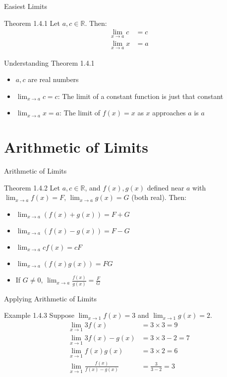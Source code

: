 \documentclass[aspectratio=169]{beamer}
\newcommand{\limx}[2]{\lim_{x \to #1} #2}
\begin{document}
\begin{frame}{Easiest Limits}
\begin{block}{Theorem 1.4.1}
Let $a, c \in \mathbb{R}$. Then:
\begin{align*}
  \limx{a}{c} &= c \\
  \limx{a}{x} &= a
\end{align*}
\end{block}
\end{frame}

\begin{frame}{Understanding Theorem 1.4.1}
\begin{itemize}
  \item $a, c$ are real numbers
  \item $\limx{a}{c} = c$: The limit of a constant function is just that constant
  \item $\limx{a}{x} = a$: The limit of $f(x) = x$ as $x$ approaches $a$ is $a$
\end{itemize}
\end{frame}

\section{Arithmetic of Limits}

\begin{frame}{Arithmetic of Limits}
\begin{block}{Theorem 1.4.2}
Let $a, c \in \mathbb{R}$, and $f(x), g(x)$ defined near $a$ with $\limx{a}{f(x)} = F$, $\limx{a}{g(x)} = G$ (both real). Then:
\begin{itemize}
  \item $\limx{a}{(f(x) + g(x))} = F + G$
  \item $\limx{a}{(f(x) - g(x))} = F - G$
  \item $\limx{a}{c f(x)} = cF$
  \item $\limx{a}{(f(x) g(x))} = FG$
  \item If $G \neq 0$, $\limx{a}{\frac{f(x)}{g(x)}} = \frac{F}{G}$
\end{itemize}
\end{block}
\end{frame}

\begin{frame}{Applying Arithmetic of Limits}
\begin{block}{Example 1.4.3}
Suppose $\limx{1}{f(x)} = 3$ and $\limx{1}{g(x)} = 2$.
\begin{align*}
  \limx{1}{3f(x)} &= 3 \times 3 = 9 \\
  \limx{1}{3f(x) - g(x)} &= 3 \times 3 - 2 = 7 \\
  \limx{1}{f(x)g(x)} &= 3 \times 2 = 6 \\
  \limx{1}{\frac{f(x)}{f(x) - g(x)}} &= \frac{3}{3-2} = 3
\end{align*}
\end{block}
\end{frame}
\end{document}
